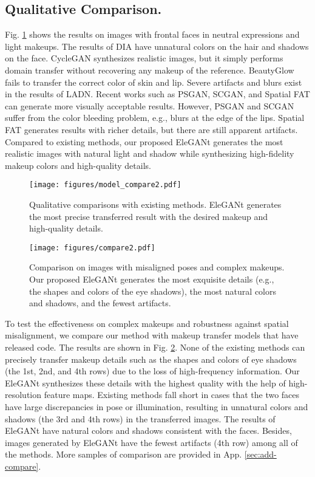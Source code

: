\subsection{Qualitative Comparison.}
Fig. \ref{fig:model_comparison} shows the results on images with frontal faces in neutral expressions and light makeups. The results of DIA have unnatural colors on the hair and shadows on the face. CycleGAN synthesizes realistic images, but it simply performs domain transfer without recovering any makeup of the reference. BeautyGlow fails to transfer the correct color of skin and lip. Severe artifacts and blurs exist in the results of LADN. Recent works such as PSGAN, SCGAN, and Spatial FAT can generate more visually acceptable results. However, PSGAN and SCGAN suffer from the color bleeding problem, e.g., blurs at the edge of the lips. Spatial FAT generates results with richer details, but there are still apparent artifacts. Compared to existing methods, our proposed EleGANt generates the most realistic images with natural light and shadow while synthesizing high-fidelity makeup colors and high-quality details.

\begin{figure}[t]
    \setlength{\abovedisplayskip}{0cm}
    \setlength{\abovecaptionskip}{-0.2cm}
    \setlength{\belowcaptionskip}{0.1cm}
    \centering
    \texttt{[image: figures/model\_compare2.pdf]}
    \caption{Qualitative comparisons with existing methods. EleGANt generates the most precise transferred result with the desired makeup and high-quality details.}
    \label{fig:model_comparison}
\end{figure}
\begin{figure}[!t]
    \setlength{\abovedisplayskip}{0cm}
    \setlength{\belowcaptionskip}{-0.2cm}
    \centering
    \texttt{[image: figures/compare2.pdf]}
    \caption{Comparison on images with misaligned poses and complex makeups. Our proposed EleGANt generates the most exquisite details (e.g., the shapes and colors of the eye shadows), the most natural colors and shadows, and the fewest artifacts.}
    \label{fig:robuts_comparison}
\end{figure}

To test the effectiveness on complex makeups and robustness against spatial misalignment, we compare our method with makeup transfer models that have released code. The results are shown in Fig. \ref{fig:robuts_comparison}. None of the existing methods can precisely transfer makeup details such as the shapes and colors of eye shadows (the 1st, 2nd, and 4th rows) due to the loss of high-frequency information. Our EleGANt synthesizes these details with the highest quality with the help of high-resolution feature maps. Existing methods fall short in cases that the two faces have large discrepancies in pose or illumination, resulting in unnatural colors and shadows (the 3rd and 4th rows) in the transferred images. The results of EleGANt have natural colors and shadows consistent with the faces. Besides, images generated by EleGANt have the fewest artifacts (4th row) among all of the methods. More samples of comparison are provided in App. %
\ref{sec:add-compare}. 

